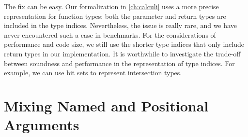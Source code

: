 The fix can be easy. Our formalization in \autoref{ch:calculi} uses a more
precise representation for function types: both the parameter and return types
are included in the type indices. Nevertheless, the issue is really rare, and we
have never encountered such a case in benchmarks. For the considerations of
performance and code size, we still use the shorter type indices that only
include return types in our implementation. It is worthwhile to investigate the
trade-off between soundness and performance in the representation of type
indices. For example, we can use bit sets to represent intersection types.

\section{Mixing Named and Positional Arguments}

